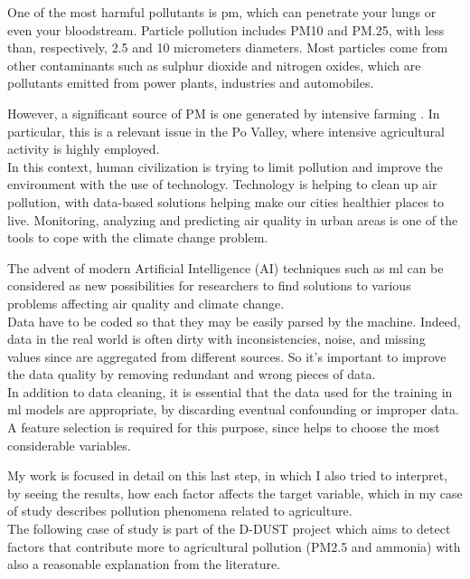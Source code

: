 One of the most harmful pollutants is \gls{pm}, which can penetrate your lungs or even your bloodstream.\newline 
Particle pollution includes PM10 and PM.25, with less than, respectively, 2.5 and 10 micrometers diameters.
Most particles come from other contaminants such as sulphur dioxide and nitrogen oxides, which are pollutants emitted from power plants, industries and automobiles.\par
However, a significant source of PM is one generated by intensive farming \cite{burkart2007diffuse}.
In particular, this is a relevant issue in the Po Valley, where intensive agricultural activity is highly employed.\\
In this context, human civilization is trying to limit pollution and improve the environment with the use of technology.\newline
Technology is helping to clean up air pollution, with data-based solutions helping make our cities healthier places to live.\newline
Monitoring, analyzing and predicting air quality in urban areas is one of the tools to cope with the climate change problem.\par
The advent of modern Artificial Intelligence (AI) techniques such as \gls{ml} can be considered as new possibilities for researchers to find solutions to various problems affecting air quality and climate change.
\\
Data have to be coded so that they may be easily parsed by the machine. 
Indeed, data in the real world is often dirty with inconsistencies, noise, and missing values since are aggregated from different sources. So it's important to improve the data quality by removing redundant and wrong pieces of data.\\
In addition to data cleaning, it is essential that the data used for the training in \acrshort{ml} models are appropriate, by discarding eventual confounding or improper data.\\
A feature selection is required for this purpose, since helps to choose the most considerable variables.\par
My work is focused in detail on this last step, in which I also tried to interpret, by seeing the results, how each factor affects the target variable, which in my case of study describes pollution phenomena related to agriculture.\\
The following case of study is part of the D-DUST project which aims to detect factors that contribute more to agricultural pollution (PM2.5 and ammonia) with also a reasonable explanation from the literature.\\
